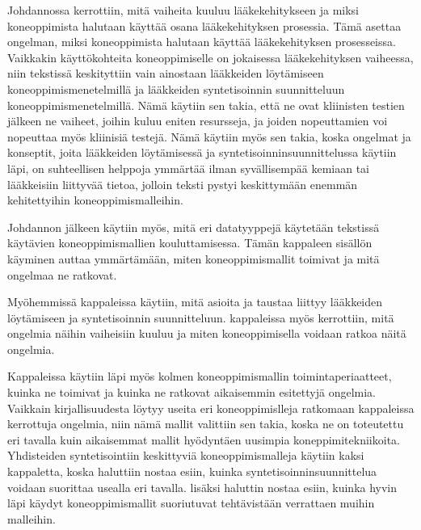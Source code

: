 \documentclass[finnish,twoside,censored,tkt,sw-line]{HYthesisML}
\begin{document}
Johdannossa kerrottiin, mitä vaiheita kuuluu lääkekehitykseen ja miksi koneoppimista halutaan käyttää osana lääkekehityksen prosessia.
Tämä asettaa ongelman, miksi koneoppimista halutaan käyttää lääkekehityksen prosesseissa.
Vaikkakin käyttökohteita koneoppimiselle on jokaisessa lääkekehityksen vaiheessa, niin tekstissä keskityttiin vain ainostaan lääkkeiden löytämiseen koneoppimismenetelmillä ja lääkkeiden syntetisoinnin suunnitteluun koneoppimismenetelmillä.
Nämä käytiin sen takia, että ne ovat kliinisten testien jälkeen ne vaiheet, joihin kuluu eniten resursseja, ja joiden nopeuttamien voi nopeuttaa myös kliinisiä testejä.
Nämä käytiin myös sen takia, koska ongelmat ja konseptit, joita lääkkeiden löytämisessä ja syntetisoinninsuunnittelussa käytiin läpi, on suhteellisen helppoja ymmärtää ilman syvällisempää kemiaan tai lääkkeisiin liittyvää tietoa, jolloin teksti pystyi keskittymään enemmän kehitettyihin koneoppimismalleihin.

Johdannon jälkeen käytiin myös, mitä eri datatyyppejä käytetään tekstissä käytävien koneoppimismallien kouluttamisessa.
Tämän kappaleen sisällön käyminen auttaa ymmärtämään, miten koneoppimismallit toimivat ja mitä ongelmaa ne ratkovat.

Myöhemmissä kappaleissa käytiin, mitä asioita ja taustaa liittyy lääkkeiden löytämiseen ja syntetisoinnin suunnitteluun.
kappaleissa myös kerrottiin, mitä ongelmia näihin vaiheisiin kuuluu ja miten koneoppimisella voidaan ratkoa näitä ongelmia.

Kappaleissa käytiin läpi myös kolmen koneoppimismallin toimintaperiaatteet, kuinka ne toimivat ja kuinka ne ratkovat aikaisemmin esitettyjä ongelmia.
Vaikkain kirjallisuudesta löytyy useita eri koneoppimislleja ratkomaan kappaleissa kerrottuja ongelmia, niin nämä mallit valittiin sen takia, koska ne on toteutettu eri tavalla kuin aikaisemmat mallit hyödyntäen uusimpia koneppimitekniikoita.
Yhdisteiden syntetisointiin keskittyviä koneoppimismalleja käytiin kaksi kappaletta, koska haluttiin nostaa esiin, kuinka syntetisoinninsuunnittelua voidaan suorittaa usealla eri tavalla.
lisäksi haluttin nostaa esiin, kuinka hyvin läpi käydyt koneoppimismallit suoriutuvat tehtävistään verrattaen muihin malleihin.

\cleardoublepage{}                          %
\printbibliography{}

\backmatter{}
\end{document}
